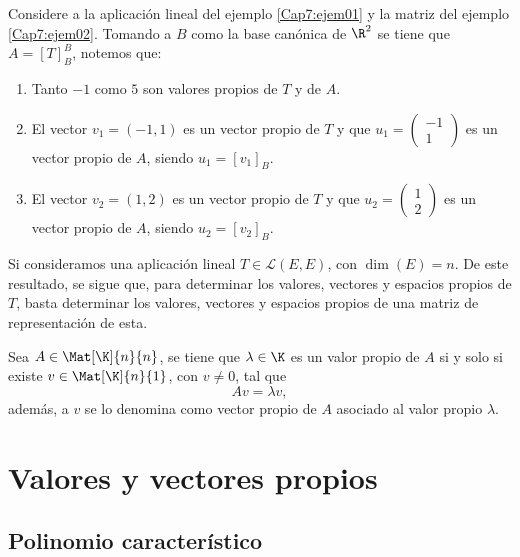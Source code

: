 \documentclass[compacto,10pt]{pubciencias-notas}
\begin{document}
\begin{ejem}\hspace{0pt} Considere a la aplicación lineal del ejemplo \ref{Cap7:ejem01} y la matriz del ejemplo \ref{Cap7:ejem02}. Tomando a $B$ como la base canónica de $\R^{2}$ se tiene que $A = [T]_{B}^{B}$, notemos que:
\begin{enumerate}
    \item Tanto $-1$ como $5$ son valores propios de $T$ y de $A$.
    \item El vector $v_{1} = (-1,1)$ es un vector propio de $T$ y que $u_{1} = \begin{pmatrix}-1\\1\end{pmatrix}$ es un vector propio de $A$, siendo 
    $u_{1} = [v_{1}]_{B}$.
    \item El vector $v_{2} = (1,2)$ es un vector propio de $T$ y que $u_{2} = \begin{pmatrix}1\\2\end{pmatrix}$ es un vector propio de $A$, siendo 
    $u_{2} = [v_{2}]_{B}$.
\end{enumerate}
\end{ejem}

\begin{obs}
Si consideramos una aplicación lineal $T\in\mathscr{L}(E, E)$, con $\dim(E)=n$. De este resultado, se sigue que, para determinar los valores, vectores y espacios propios de $T$, basta determinar los valores, vectores y espacios propios de una matriz de representación de esta.
\end{obs}

\begin{prop}
Sea $A\in \Mat[\K]{n}{n}$, se tiene que $\lambda\in \K$ es un valor propio de $A$ si y solo si existe $v\in \Mat[\K]{n}{1}$, con $v\neq 0$, tal que
\[
    Av = \lambda v,
\]
además, a $v$ se lo denomina como vector propio de $A$ asociado al valor propio $\lambda$.
\end{prop}


\setcounter{section}{6}
\section{Valores y vectores propios}


\setcounter{subsection}{1}
\subsection{Polinomio caracter\'istico}
\end{document}
